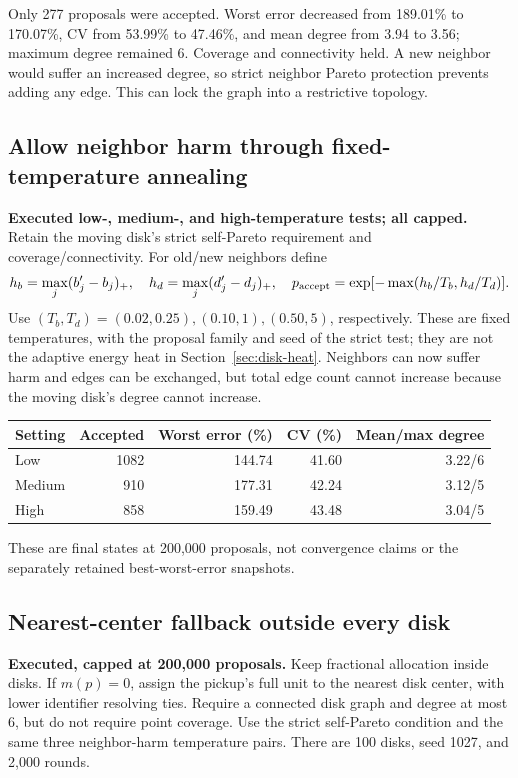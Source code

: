 \documentclass[11pt]{article}
\begin{document}
Only 277 proposals were accepted. Worst error decreased from 189.01\% to
170.07\%, CV from 53.99\% to 47.46\%, and mean degree from 3.94 to 3.56;
maximum degree remained 6. Coverage and connectivity held. A new neighbor
would suffer an increased degree, so strict neighbor Pareto protection prevents
adding any edge. This can lock the graph into a restrictive topology.

\subsection{Allow neighbor harm through fixed-temperature annealing}
\textbf{Executed low-, medium-, and high-temperature tests; all capped.}
Retain the moving disk's strict self-Pareto requirement and coverage/connectivity.
For old/new neighbors define
\[
 h_b=\max_j(b'_j-b_j)_+,\quad h_d=\max_j(d'_j-d_j)_+,\quad
 p_{\rm accept}=\exp[-\max(h_b/T_b,h_d/T_d)].
\]
Use $(T_b,T_d)=(0.02,0.25),(0.10,1),(0.50,5)$, respectively.
These are fixed temperatures, with the proposal family and seed of the strict
test; they are not the adaptive energy heat in Section~\ref{sec:disk-heat}.
Neighbors can now suffer harm and edges can be exchanged, but total edge count
cannot increase because the moving disk's degree cannot increase.

\begin{center}\begin{tabular}{lrrrr}
\toprule Setting & Accepted & Worst error (\%) & CV (\%) & Mean/max degree\\\midrule
Low&1082&144.74&41.60&3.22/6\\
Medium&910&177.31&42.24&3.12/5\\
High&858&159.49&43.48&3.04/5\\\bottomrule
\end{tabular}\end{center}
These are final states at 200,000 proposals, not convergence claims or the
separately retained best-worst-error snapshots.

\subsection{Nearest-center fallback outside every disk}
\textbf{Executed, capped at 200,000 proposals.}
Keep fractional allocation inside disks. If $m(p)=0$, assign the pickup's full
unit to the nearest disk center, with lower identifier resolving ties.
Require a connected disk graph and degree at most 6, but do not require point
coverage. Use the strict self-Pareto condition and the same three neighbor-harm
temperature pairs. There are 100 disks, seed 1027, and 2,000 rounds.
\end{document}
